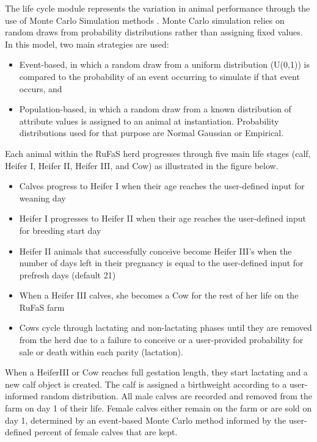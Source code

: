 \begin{refsection}
The life cycle module represents the variation in animal performance through the use of Monte Carlo Simulation methods \parencite{reuven2017}. Monte Carlo simulation relies on random draws from probability distributions rather than assigning fixed values. In this model, two main strategies are used:
\begin{itemize}
    \item Event-based, in which a random draw from a uniform distribution (U(0,1)) is compared to the probability of an event occurring to simulate if that event occurs, and 
    \item Population-based, in which a random draw from a known distribution of attribute values is assigned to an animal at instantiation. Probability distributions used for that purpose are Normal Gaussian or Empirical. 
\end{itemize}

Each animal within the RuFaS herd progresses through five main life stages (calf, Heifer I, Heifer II, Heifer III, and Cow) as illustrated in the figure below. 
\begin{itemize}
    \item Calves progress to Heifer I when their age reaches the user-defined input for weaning day
    \item Heifer I progresses to Heifer II when their age reaches the user-defined input for breeding start day 
    \item Heifer II animals that successfully conceive become Heifer III's when the number of days left in their pregnancy is equal to the user-defined input for prefresh days (default 21)
    \item When a Heifer III calves, she becomes a Cow for the rest of her life on the RuFaS farm
    \item Cows cycle through lactating and non-lactating phases until they are removed from the herd due to a failure to conceive or a user-provided probability for sale or death within each parity (lactation).

\end{itemize}

When a HeiferIII or Cow reaches full gestation length, they start lactating and a new calf object is created. The calf is assigned a birthweight according to a user-informed random distribution. All male calves are recorded and removed from the farm on day 1 of their life. Female calves either remain on the farm or are sold on day 1, determined by an event-based Monte Carlo method informed by the user-defined percent of female calves that are kept. 




\end{refsection}
